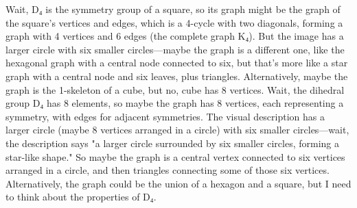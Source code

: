 Wait, D₄ is the symmetry group of a square, so its graph might be the graph of the square's vertices and edges, which is a 4-cycle with two diagonals, forming a graph with 4 vertices and 6 edges (the complete graph K₄). But the image has a larger circle with six smaller circles—maybe the graph is a different one, like the hexagonal graph with a central node connected to six, but that's more like a star graph with a central node and six leaves, plus triangles. Alternatively, maybe the graph is the 1-skeleton of a cube, but no, cube has 8 vertices. Wait, the dihedral group D₄ has 8 elements, so maybe the graph has 8 vertices, each representing a symmetry, with edges for adjacent symmetries. The visual description has a larger circle (maybe 8 vertices arranged in a circle) with six smaller circles—wait, the description says "a larger circle surrounded by six smaller circles, forming a star-like shape." So maybe the graph is a central vertex connected to six vertices arranged in a circle, and then triangles connecting some of those six vertices. Alternatively, the graph could be the union of a hexagon and a square, but I need to think about the properties of D₄. 

